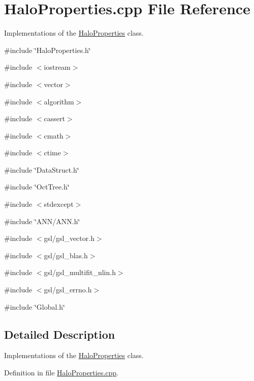 \section{HaloProperties.cpp File Reference}
\label{HaloProperties_8cpp}


Implementations of the \hyperlink{classHaloProperties}{HaloProperties} class.  


{\ttfamily \#include \char`\"{}HaloProperties.h\char`\"{}}\par
{\ttfamily \#include $<$iostream$>$}\par
{\ttfamily \#include $<$vector$>$}\par
{\ttfamily \#include $<$algorithm$>$}\par
{\ttfamily \#include $<$cassert$>$}\par
{\ttfamily \#include $<$cmath$>$}\par
{\ttfamily \#include $<$ctime$>$}\par
{\ttfamily \#include \char`\"{}DataStruct.h\char`\"{}}\par
{\ttfamily \#include \char`\"{}OctTree.h\char`\"{}}\par
{\ttfamily \#include $<$stdexcept$>$}\par
{\ttfamily \#include \char`\"{}ANN/ANN.h\char`\"{}}\par
{\ttfamily \#include $<$gsl/gsl\_\-vector.h$>$}\par
{\ttfamily \#include $<$gsl/gsl\_\-blas.h$>$}\par
{\ttfamily \#include $<$gsl/gsl\_\-multifit\_\-nlin.h$>$}\par
{\ttfamily \#include $<$gsl/gsl\_\-errno.h$>$}\par
{\ttfamily \#include \char`\"{}Global.h\char`\"{}}\par


\subsection{Detailed Description}
Implementations of the \hyperlink{classHaloProperties}{HaloProperties} class. 

Definition in file \hyperlink{HaloProperties_8cpp_source}{HaloProperties.cpp}.

